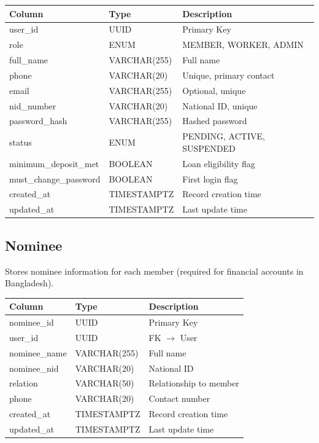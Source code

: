 \documentclass[11pt,a4paper]{article}
\begin{document}
\begin{tabular}{@{}p{4cm}p{3cm}p{6cm}@{}}
\toprule
\textbf{Column} & \textbf{Type} & \textbf{Description} \\
\midrule
user\_id & UUID & Primary Key \\
role & ENUM & MEMBER, WORKER, ADMIN \\
full\_name & VARCHAR(255) & Full name \\
phone & VARCHAR(20) & Unique, primary contact \\
email & VARCHAR(255) & Optional, unique \\
nid\_number & VARCHAR(20) & National ID, unique \\
password\_hash & VARCHAR(255) & Hashed password \\
status & ENUM & PENDING, ACTIVE, SUSPENDED \\
minimum\_deposit\_met & BOOLEAN & Loan eligibility flag \\
must\_change\_password & BOOLEAN & First login flag \\
created\_at & TIMESTAMPTZ & Record creation time \\
updated\_at & TIMESTAMPTZ & Last update time \\
\bottomrule
\end{tabular}

\subsection{Nominee}

Stores nominee information for each member (required for financial accounts in Bangladesh).

\begin{tabular}{@{}p{4cm}p{3cm}p{6cm}@{}}
\toprule
\textbf{Column} & \textbf{Type} & \textbf{Description} \\
\midrule
nominee\_id & UUID & Primary Key \\
user\_id & UUID & FK $\rightarrow$ User \\
nominee\_name & VARCHAR(255) & Full name \\
nominee\_nid & VARCHAR(20) & National ID \\
relation & VARCHAR(50) & Relationship to member \\
phone & VARCHAR(20) & Contact number \\
created\_at & TIMESTAMPTZ & Record creation time \\
updated\_at & TIMESTAMPTZ & Last update time \\
\bottomrule
\end{tabular}
\end{document}
